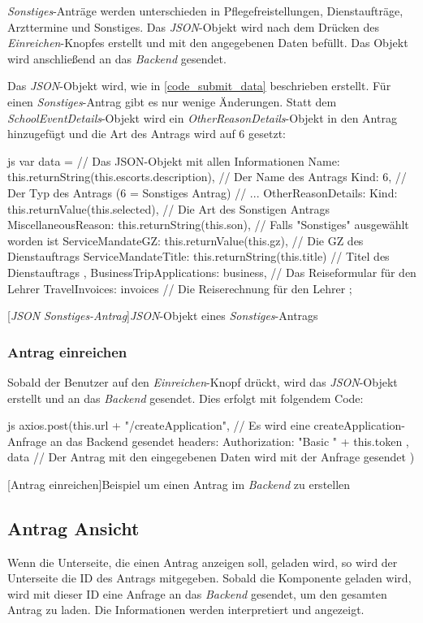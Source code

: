 \textit{Sonstiges}-Anträge werden unterschieden in Pflegefreistellungen, Dienstaufträge, Arzttermine und Sonstiges. Das \textit{JSON}-Objekt wird nach dem Drücken des \textit{Einreichen}-Knopfes erstellt und mit den angegebenen Daten befüllt. Das Objekt wird anschließend an das \textit{Backend} gesendet.\newpage

Das \textit{JSON}-Objekt wird, wie in \autoref{code_submit_data} beschrieben erstellt. Für einen \textit{Sonstiges}-Antrag gibt es nur wenige Änderungen.
Statt dem \textit{SchoolEventDetails}-Objekt wird ein \textit{OtherReasonDetails}-Objekt in den Antrag hinzugefügt und die Art des Antrags wird auf 6 gesetzt:
\begin{code}{js}
var data = {		// Das JSON-Objekt mit allen Informationen
	Name: this.returnString(this.escorts.description),	// Der Name des Antrags
	Kind: 6,	// Der Typ des Antrags (6 = Sonstiges Antrag)
	// ...
	OtherReasonDetails: {
		Kind: this.returnValue(this.selected),	// Die Art des Sonstigen Antrags
		MiscellaneousReason: this.returnString(this.son),	// Falls "Sonstiges" ausgewählt worden ist
		ServiceMandateGZ: this.returnValue(this.gz),	// Die GZ des Dienstauftrags
		ServiceMandateTitle: this.returnString(this.title)	// Titel des Dienstauftrags
	},
	BusinessTripApplications: business,	// Das Reiseformular für den Lehrer
	TravelInvoices: invoices	// Die Reiserechnung für den Lehrer
};
\end{code}
[\textit{JSON} \textit{Sonstiges-Antrag}]{\textit{JSON}-Objekt eines \textit{Sonstiges}-Antrags}~\\
\subsubsection{Antrag einreichen}
Sobald der Benutzer auf den \textit{Einreichen}-Knopf drückt, wird das \textit{JSON}-Objekt erstellt und an das \textit{Backend} gesendet. Dies erfolgt mit folgendem Code:
\begin{code}{js}
	axios.post(this.url + "/createApplication", // Es wird eine createApplication-Anfrage an das Backend gesendet
	{
		headers: {
			Authorization: "Basic " + this.token
		}
	},
	data // Der Antrag mit den eingegebenen Daten wird mit der Anfrage gesendet
	)
\end{code}
[Antrag einreichen]{Beispiel um einen Antrag im \textit{Backend} zu erstellen}~\\
\newpage
\subsection{Antrag Ansicht}
\label{sec:antrag_ansicht}
Wenn die Unterseite, die einen Antrag anzeigen soll, geladen wird, so wird der Unterseite die ID des Antrags mitgegeben. Sobald die Komponente geladen wird, wird mit dieser ID eine Anfrage an das \textit{Backend} gesendet, um den gesamten Antrag zu laden. Die Informationen werden interpretiert und angezeigt.
